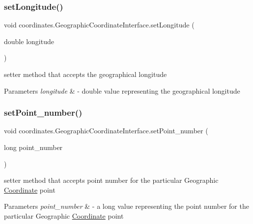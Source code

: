 \subsubsection{\texorpdfstring{set\+Longitude()}{setLongitude()}}
{\footnotesize\ttfamily void coordinates.\+Geographic\+Coordinate\+Interface.\+set\+Longitude (\begin{DoxyParamCaption}\item[{double}]{longitude }\end{DoxyParamCaption})}



setter method that accepts the geographical longitude 


\begin{DoxyParams}{Parameters}
{\em longitude} & -\/ double value representing the geographical longitude \\
\hline
\end{DoxyParams}
\mbox{\label{classcoordinates_1_1_geographic_coordinate_interface_a50835144a956800c57f7a5a9d3491cb6}} 
\subsubsection{\texorpdfstring{set\+Point\+\_\+number()}{setPoint\_number()}}
{\footnotesize\ttfamily void coordinates.\+Geographic\+Coordinate\+Interface.\+set\+Point\+\_\+number (\begin{DoxyParamCaption}\item[{long}]{point\+\_\+number }\end{DoxyParamCaption})}



setter method that accepts point number for the particular Geographic \hyperlink{classcoordinates_1_1_coordinate}{Coordinate} point 


\begin{DoxyParams}{Parameters}
{\em point\+\_\+number} & -\/ a long value representing the point number for the particular Geographic \hyperlink{classcoordinates_1_1_coordinate}{Coordinate} point \\
\hline
\end{DoxyParams}


